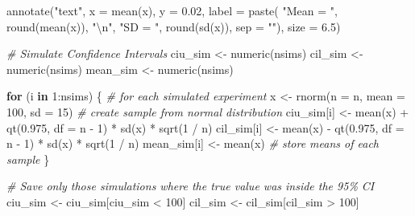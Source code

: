 \documentclass[
  oneside]{book}
\newenvironment{Shaded}{\begin{snugshade}}{\end{snugshade}}
\newcommand{\AttributeTok}[1]{\textcolor[rgb]{0.77,0.63,0.00}{#1}}
\newcommand{\CommentTok}[1]{\textcolor[rgb]{0.56,0.35,0.01}{\textit{#1}}}
\newcommand{\ControlFlowTok}[1]{\textcolor[rgb]{0.13,0.29,0.53}{\textbf{#1}}}
\newcommand{\DecValTok}[1]{\textcolor[rgb]{0.00,0.00,0.81}{#1}}
\newcommand{\FloatTok}[1]{\textcolor[rgb]{0.00,0.00,0.81}{#1}}
\newcommand{\FunctionTok}[1]{\textcolor[rgb]{0.00,0.00,0.00}{#1}}
\newcommand{\NormalTok}[1]{#1}
\newcommand{\OtherTok}[1]{\textcolor[rgb]{0.56,0.35,0.01}{#1}}
\newcommand{\SpecialCharTok}[1]{\textcolor[rgb]{0.00,0.00,0.00}{#1}}
\newcommand{\StringTok}[1]{\textcolor[rgb]{0.31,0.60,0.02}{#1}}
\begin{document}
\begin{Shaded}
\begin{Highlighting}[]
  \FunctionTok{annotate}\NormalTok{(}\StringTok{"text"}\NormalTok{, }\AttributeTok{x =} \FunctionTok{mean}\NormalTok{(x), }\AttributeTok{y =} \FloatTok{0.02}\NormalTok{, }\AttributeTok{label =} \FunctionTok{paste}\NormalTok{(}
    \StringTok{"Mean = "}\NormalTok{, }\FunctionTok{round}\NormalTok{(}\FunctionTok{mean}\NormalTok{(x)), }\StringTok{"}\SpecialCharTok{\textbackslash{}n}\StringTok{"}\NormalTok{,}
    \StringTok{"SD = "}\NormalTok{, }\FunctionTok{round}\NormalTok{(}\FunctionTok{sd}\NormalTok{(x)), }\AttributeTok{sep =} \StringTok{""}\NormalTok{), }\AttributeTok{size =} \FloatTok{6.5}\NormalTok{)}

\CommentTok{\# Simulate Confidence Intervals}
\NormalTok{ciu\_sim }\OtherTok{\textless{}{-}} \FunctionTok{numeric}\NormalTok{(nsims)}
\NormalTok{cil\_sim }\OtherTok{\textless{}{-}} \FunctionTok{numeric}\NormalTok{(nsims)}
\NormalTok{mean\_sim }\OtherTok{\textless{}{-}} \FunctionTok{numeric}\NormalTok{(nsims)}

\ControlFlowTok{for}\NormalTok{ (i }\ControlFlowTok{in} \DecValTok{1}\SpecialCharTok{:}\NormalTok{nsims) \{ }\CommentTok{\# for each simulated experiment}
\NormalTok{  x }\OtherTok{\textless{}{-}} \FunctionTok{rnorm}\NormalTok{(}\AttributeTok{n =}\NormalTok{ n, }\AttributeTok{mean =} \DecValTok{100}\NormalTok{, }\AttributeTok{sd =} \DecValTok{15}\NormalTok{) }\CommentTok{\# create sample from normal distribution}
\NormalTok{  ciu\_sim[i] }\OtherTok{\textless{}{-}} \FunctionTok{mean}\NormalTok{(x) }\SpecialCharTok{+} \FunctionTok{qt}\NormalTok{(}\FloatTok{0.975}\NormalTok{, }\AttributeTok{df =}\NormalTok{ n }\SpecialCharTok{{-}} \DecValTok{1}\NormalTok{) }\SpecialCharTok{*} \FunctionTok{sd}\NormalTok{(x) }\SpecialCharTok{*} \FunctionTok{sqrt}\NormalTok{(}\DecValTok{1} \SpecialCharTok{/}\NormalTok{ n)}
\NormalTok{  cil\_sim[i] }\OtherTok{\textless{}{-}} \FunctionTok{mean}\NormalTok{(x) }\SpecialCharTok{{-}} \FunctionTok{qt}\NormalTok{(}\FloatTok{0.975}\NormalTok{, }\AttributeTok{df =}\NormalTok{ n }\SpecialCharTok{{-}} \DecValTok{1}\NormalTok{) }\SpecialCharTok{*} \FunctionTok{sd}\NormalTok{(x) }\SpecialCharTok{*} \FunctionTok{sqrt}\NormalTok{(}\DecValTok{1} \SpecialCharTok{/}\NormalTok{ n)}
\NormalTok{  mean\_sim[i] }\OtherTok{\textless{}{-}} \FunctionTok{mean}\NormalTok{(x) }\CommentTok{\# store means of each sample}
\NormalTok{\}}

\CommentTok{\# Save only those simulations where the true value was inside the 95\% CI}
\NormalTok{ciu\_sim }\OtherTok{\textless{}{-}}\NormalTok{ ciu\_sim[ciu\_sim }\SpecialCharTok{\textless{}} \DecValTok{100}\NormalTok{]}
\NormalTok{cil\_sim }\OtherTok{\textless{}{-}}\NormalTok{ cil\_sim[cil\_sim }\SpecialCharTok{\textgreater{}} \DecValTok{100}\NormalTok{]}


\end{Highlighting}
\end{Shaded}
\end{document}

